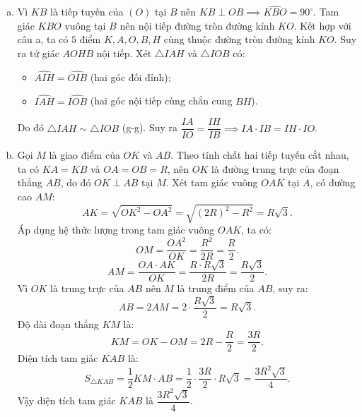 \begin{bt}
{\begin{enumerate}[a)]
	\item Vì $KB$ là tiếp tuyến của $(O)$ tại $B$ nên $KB \perp OB \implies \widehat{KBO} = 90^\circ$.
	Tam giác $KBO$ vuông tại $B$ nên nội tiếp đường tròn đường kính $KO$.
	Kết hợp với câu a, ta có $5$ điểm $K, A, O, B, H$ cùng thuộc đường tròn đường kính $KO$.
	Suy ra tứ giác $AOHB$ nội tiếp.
	Xét $\triangle IAH$ và $\triangle IOB$ có:
	\begin{itemize}
		\item $\widehat{AIH} = \widehat{OIB}$ (hai góc đối đỉnh);
		\item $\widehat{IAH} = \widehat{IOB}$ (hai góc nội tiếp cùng chắn cung $BH$).
	\end{itemize}
	Do đó $\triangle IAH \sim \triangle IOB$ (g-g).
	Suy ra $\dfrac{IA}{IO} = \dfrac{IH}{IB} \implies IA \cdot IB = IH \cdot IO$.
	\item Gọi $M$ là giao điểm của $OK$ và $AB$.
	Theo tính chất hai tiếp tuyến cắt nhau, ta có $KA = KB$ và $OA = OB = R$, nên $OK$ là đường trung trực của đoạn thẳng $AB$, do đó $OK \perp AB$ tại $M$.
	Xét tam giác vuông $OAK$ tại $A$, có đường cao $AM$:
	$$AK = \sqrt{OK^2 - OA^2} = \sqrt{(2R)^2 - R^2} = R\sqrt{3}.$$
	Áp dụng hệ thức lượng trong tam giác vuông $OAK$, ta có:
	$$OM = \dfrac{OA^2}{OK} = \dfrac{R^2}{2R} = \dfrac{R}{2}.$$
	$$AM = \dfrac{OA \cdot AK}{OK} = \dfrac{R \cdot R\sqrt{3}}{2R} = \dfrac{R\sqrt{3}}{2}.$$
	Vì $OK$ là trung trực của $AB$ nên $M$ là trung điểm của $AB$, suy ra:
	$$AB = 2AM = 2 \cdot \dfrac{R\sqrt{3}}{2} = R\sqrt{3}.$$
	Độ dài đoạn thẳng $KM$ là:
	$$KM = OK - OM = 2R - \dfrac{R}{2} = \dfrac{3R}{2}.$$
	Diện tích tam giác $KAB$ là:
	$$S_{\triangle KAB} = \dfrac{1}{2} KM \cdot AB = \dfrac{1}{2} \cdot \dfrac{3R}{2} \cdot R\sqrt{3} = \dfrac{3R^2\sqrt{3}}{4}.$$
	Vậy diện tích tam giác $KAB$ là $\dfrac{3R^2\sqrt{3}}{4}$.
\end{enumerate}
}
\end{bt}


